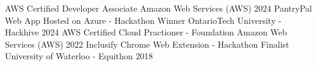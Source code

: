 

\begin{cvhonors}

  \cvhonor
  {AWS Certified Developer Associate} %
  {Amazon Web Services (AWS)} %
  {} %
  {2024} %
  \cvhonor
  {PantryPal Web App Hosted on Azure - Hackathon Winner} %
  {OntarioTech University - Hackhive} %
  {} %
  {2024} %
  \cvhonor
  {AWS Certified Cloud Practioner - Foundation} %
  {Amazon Web Services (AWS)} %
  {} %
  {2022} %
  \cvhonor
  {Inclusify Chrome Web Extension - Hackathon Finalist} %
  {University of Waterloo - Equithon} %
  {} %
  {2018} %
\end{cvhonors}
